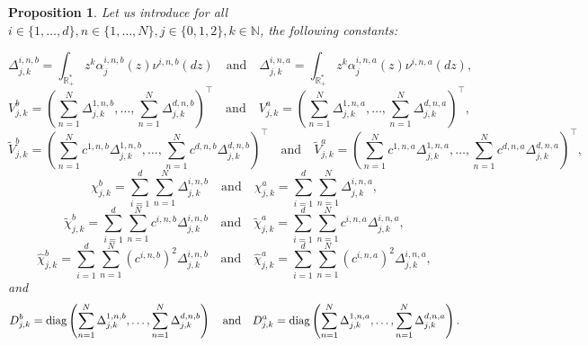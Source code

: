 \documentclass[preprint, 3p]{elsarticle}
\newcommand{\1}{{\chi}}
\newtheorem{proposition}{Proposition}
\begin{document}
\begin{proposition}\label{prop:GENansatz}
Let us introduce for all $i \in \{1, \ldots, d\}, n \in \{1,\ldots,N\}, j \in \{0, 1, 2\}, k \in \mathbb{N}$, the following constants:

$$\Delta^{i,n,b}_{j,k} = \int_{\mathbb R_+^*}\!\! z^k \alpha^{i,n,b}_j(z) \nu^{i,n,b}(dz) \quad \text{and} \quad \Delta^{i,n,a}_{j,k} = \int_{\mathbb R_+^*}\!\! z^k \alpha^{i,n,a}_j(z) \nu^{i,n,a}(dz),$$
$$V^{b}_{j,k} = \left(\sum_{n=1}^N{\Delta^{1,n,b}_{j,k}},\ldots,\sum_{n=1}^N{\Delta^{d,n,b}_{j,k}} \right)^\intercal \quad \text{and} \quad V^{a}_{j,k} = \left(\sum_{n=1}^N{\Delta^{1,n,a}_{j,k}},\ldots,\sum_{n=1}^N{\Delta^{d,n,a}_{j,k}} \right)^\intercal,$$
$${\tilde{V}^{b}_{j,k}} = \left(\sum_{n=1}^N c^{1,n,b}{\Delta^{1,n,b}_{j,k}},\ldots,\sum_{n=1}^N c^{d,n,b}{\Delta^{d,n,b}_{j,k}} \right)^\intercal \quad \text{and} \quad {\tilde{V}^{a}_{j,k}} = \left(\sum_{n=1}^N c^{1,n,a}{\Delta^{1,n,a}_{j,k}},\ldots,\sum_{n=1}^N c^{d,n,a}{\Delta^{d,n,a}_{j,k}} \right)^\intercal ,$$
$$\chi^{b}_{j,k} = \sum_{i=1}^d \sum_{n=1}^N{\Delta^{i,n,b}_{j,k}} \quad \text{and} \quad \chi^{a}_{j,k} = \sum_{i=1}^d \sum_{n=1}^N{\Delta^{i,n,a}_{j,k}} ,$$
$${\tilde{\chi}^{b}_{j,k}} = \sum_{i=1}^d \sum_{n=1}^N c^{i,n,b}{\Delta^{i,n,b}_{j,k}} \quad \text{and} \quad {\tilde{\chi}^{a}_{j,k}} = \sum_{i=1}^d \sum_{n=1}^N c^{i,n,a}{\Delta^{i,n,a}_{j,k}},$$
$${\hat{\chi}^{b}_{j,k}} = \sum_{i=1}^d \sum_{n=1}^N (c^{i,n,b})^2 {\Delta^{i,n,b}_{j,k}} \quad \text{and} \quad {\hat{\chi}^{a}_{j,k}} = \sum_{i=1}^d \sum_{n=1}^N (c^{i,n,a})^2 {\Delta^{i,n,a}_{j,k}},$$
and
$$D^b_{j,k} = \textup{diag} \left(\sum_{n=1}^N{\Delta^{1,n,b}_{j,k}},\ldots,\sum_{n=1}^N{\Delta^{d,n,b}_{j,k}}\right) \quad \text{and} \quad D^a_{j,k} = \textup{diag} \left(\sum_{n=1}^N{\Delta^{1,n,a}_{j,k}},\ldots,\sum_{n=1}^N{\Delta^{d,n,a}_{j,k}} \right).$$


\end{proposition}
\end{document}
